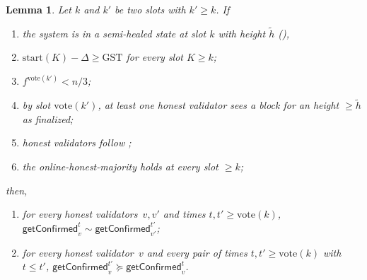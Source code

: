 \documentclass{article}
\newcommand{\start}{\ensuremath{\mathrm{start}}}
\newcommand{\vote}{\ensuremath{\mathrm{vote}}}
\newcommand{\GST}{\ensuremath{\mathrm{GST}}\xspace}
\newcommand{\comm}[1]{\ensuremath{\widetilde{#1}}}
\newcommand{\getConfirmed}{\textsf{getConfirmed}\xspace}
\theoremstyle{plain}
\newtheorem{lemma}{Lemma}
\theoremstyle{definition}
\theoremstyle{remark}
\begin{document}
\begin{lemma}\label{rev:lem:full-unbounded-from-fin}
Let $k$ and $k'$ be two slots with $k' \geq k$.
If
\begin{enumerate}
  \item\label{rev:hfuf:hs} the system is in a semi-healed state at slot $k$ with height $\comm{h}$ (),
  \item\label{rev:hfuf:sync} $\start(K) - \Delta \geq \GST$ for every slot $K \geq k$;
  \item\label{rev:hfuf:f-bound} $f^{\vote(k')}<n/3$;
  \item\label{rev:hfuf:fin} by slot $\vote(k')$, at least one honest validator sees a block for an height $\geq \comm{h}$ as finalized;
  \item\label{rev:hfuf:f} honest validators follow ;
  \item\label{rev:hfuf:ohm} the online-honest-majority holds at every slot $\geq k$;
\end{enumerate}
then,
\begin{enumerate}
  \item for every honest validators~$v,v'$ and times $t, t' \geq \vote(k)$, $\getConfirmed_v^{t} \sim \getConfirmed_{v'}^{t'}$;
  \item for every honest validator~$v$ and every pair of times $t, t' \geq \vote(k)$ with $t \leq t'$, $\getConfirmed_v^{t'} \succeq \getConfirmed_v^t$.
\end{enumerate}
\end{lemma}
\end{document}
